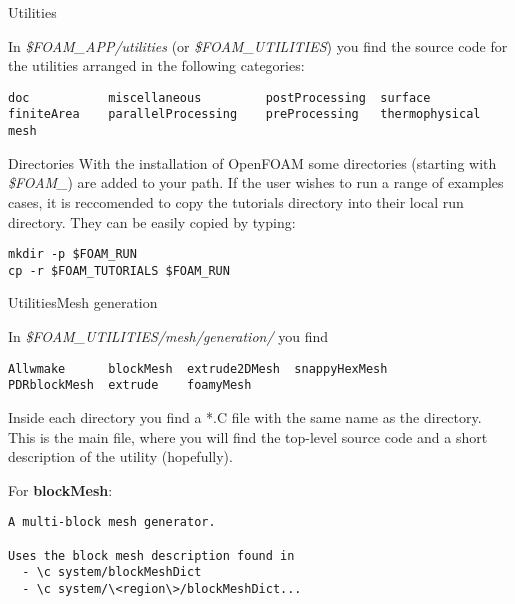 \documentclass{beamer}
\begin{document}
\begin{frame}[fragile]{Utilities}

In \emph{\$FOAM\_APP/utilities} (or \emph{\$FOAM\_UTILITIES}) you find the source code for the utilities arranged in the following categories:

\begin{scriptsize}
\begin{verbatim}
doc           miscellaneous         postProcessing  surface 
finiteArea    parallelProcessing    preProcessing   thermophysical
mesh
\end{verbatim}
\end{scriptsize}

\begin{block}{Directories}
With the installation of OpenFOAM some directories (starting with \emph{\$FOAM\_}) are added to your path. If the user wishes to run a range of examples cases, it is reccomended to copy the tutorials directory into their local run directory. They can be easily copied by typing:
\begin{small}
\begin{verbatim}
mkdir -p $FOAM_RUN
cp -r $FOAM_TUTORIALS $FOAM_RUN
\end{verbatim}
\end{small}

\end{block}

\end{frame}

\begin{frame}[fragile]{Utilities}{Mesh generation}

In \emph{\$FOAM\_UTILITIES/mesh/generation/} you find 

\begin{verbatim}
Allwmake      blockMesh  extrude2DMesh  snappyHexMesh
PDRblockMesh  extrude    foamyMesh
\end{verbatim}

Inside each directory you find a *.C file with the same name as the directory. This is the main file, where you will find the top-level source code and a short description of the utility (hopefully). 

For \textbf{blockMesh}:\\[0.2cm]

\begin{lrbox}{\mybox}
  \begin{minipage}{28em}
\begin{small}
\begin{verbatim}
A multi-block mesh generator.

Uses the block mesh description found in 
  - \c system/blockMeshDict
  - \c system/\<region\>/blockMeshDict...
\end{verbatim}
\end{small}
  \end{minipage}
\end{lrbox}

\fbox{\usebox\mybox}


\end{frame}
\end{document}
